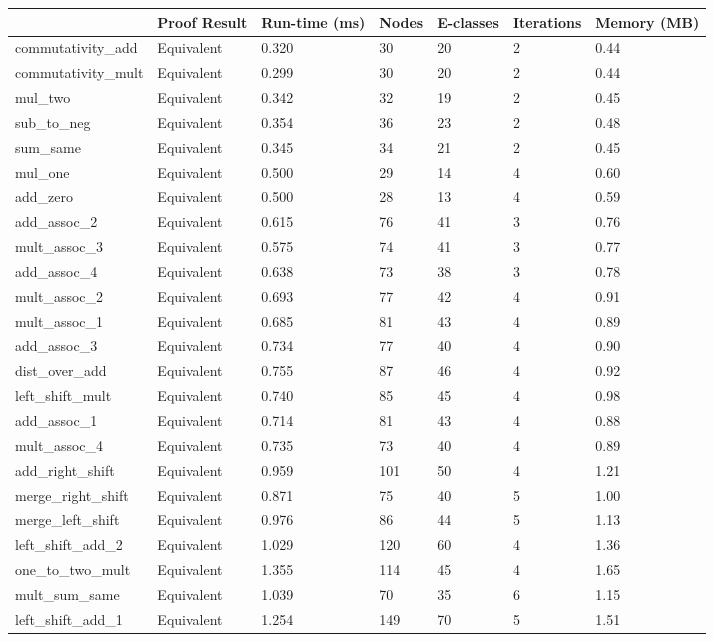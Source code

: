 \begin{tabular}{lllllll}
\toprule
 & Proof Result & Run-time (ms) & Nodes & E-classes & Iterations & Memory (MB) \\
\midrule
commutativity\_add & Equivalent & 0.320 & 30 & 20 & 2 & 0.44 \\
commutativity\_mult & Equivalent & 0.299 & 30 & 20 & 2 & 0.44 \\
mul\_two & Equivalent & 0.342 & 32 & 19 & 2 & 0.45 \\
sub\_to\_neg & Equivalent & 0.354 & 36 & 23 & 2 & 0.48 \\
sum\_same & Equivalent & 0.345 & 34 & 21 & 2 & 0.45 \\
mul\_one & Equivalent & 0.500 & 29 & 14 & 4 & 0.60 \\
add\_zero & Equivalent & 0.500 & 28 & 13 & 4 & 0.59 \\
add\_assoc\_2 & Equivalent & 0.615 & 76 & 41 & 3 & 0.76 \\
mult\_assoc\_3 & Equivalent & 0.575 & 74 & 41 & 3 & 0.77 \\
add\_assoc\_4 & Equivalent & 0.638 & 73 & 38 & 3 & 0.78 \\
mult\_assoc\_2 & Equivalent & 0.693 & 77 & 42 & 4 & 0.91 \\
mult\_assoc\_1 & Equivalent & 0.685 & 81 & 43 & 4 & 0.89 \\
add\_assoc\_3 & Equivalent & 0.734 & 77 & 40 & 4 & 0.90 \\
dist\_over\_add & Equivalent & 0.755 & 87 & 46 & 4 & 0.92 \\
left\_shift\_mult & Equivalent & 0.740 & 85 & 45 & 4 & 0.98 \\
add\_assoc\_1 & Equivalent & 0.714 & 81 & 43 & 4 & 0.88 \\
mult\_assoc\_4 & Equivalent & 0.735 & 73 & 40 & 4 & 0.89 \\
add\_right\_shift & Equivalent & 0.959 & 101 & 50 & 4 & 1.21 \\
merge\_right\_shift & Equivalent & 0.871 & 75 & 40 & 5 & 1.00 \\
merge\_left\_shift & Equivalent & 0.976 & 86 & 44 & 5 & 1.13 \\
left\_shift\_add\_2 & Equivalent & 1.029 & 120 & 60 & 4 & 1.36 \\
one\_to\_two\_mult & Equivalent & 1.355 & 114 & 45 & 4 & 1.65 \\
mult\_sum\_same & Equivalent & 1.039 & 70 & 35 & 6 & 1.15 \\
left\_shift\_add\_1 & Equivalent & 1.254 & 149 & 70 & 5 & 1.51 \\
\bottomrule
\end{tabular}
